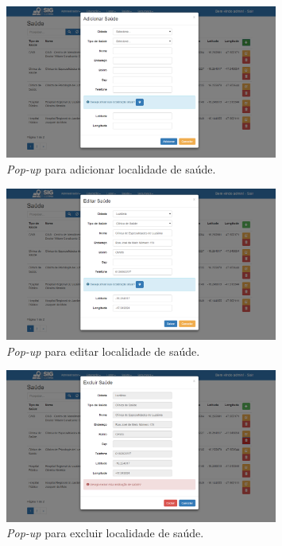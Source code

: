 \begin{figure}[h]
\centering
\includegraphics[width=0.80\textwidth]{./img/cap_IV/25-AdmAdicionar}
\caption{\textit{Pop-up} para adicionar localidade de saúde.}
\label{fig:AdmAdicionar}
\end{figure}

\newpage

\begin{figure}[h]
\centering
\includegraphics[width=0.80\textwidth]{./img/cap_IV/26-AdmEditar}
\caption{\textit{Pop-up} para editar localidade de saúde.}
\label{fig:AdmEditar}
\end{figure}

\begin{figure}[h]
\centering
\includegraphics[width=0.80\textwidth]{./img/cap_IV/27-AdmExcluir}
\caption{\textit{Pop-up} para excluir localidade de saúde.}
\label{fig:AdmExcluir}
\end{figure}

